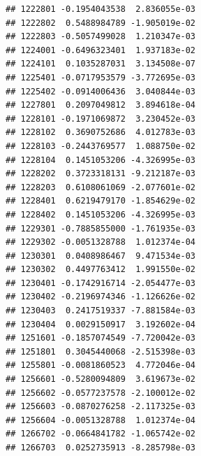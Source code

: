 \begin{frame}[fragile]
\begin{verbatim}
## 1222801 -0.1954043538  2.836055e-03
## 1222802  0.5488984789 -1.905019e-02
## 1222803 -0.5057499028  1.210347e-03
## 1224001 -0.6496323401  1.937183e-02
## 1224101  0.1035287031  3.134508e-07
## 1225401 -0.0717953579 -3.772695e-03
## 1225402 -0.0914006436  3.040844e-03
## 1227801  0.2097049812  3.894618e-04
## 1228101 -0.1971069872  3.230452e-03
## 1228102  0.3690752686  4.012783e-03
## 1228103 -0.2443769577  1.088750e-02
## 1228104  0.1451053206 -4.326995e-03
## 1228202  0.3723318131 -9.212187e-03
## 1228203  0.6108061069 -2.077601e-02
## 1228401  0.6219479170 -1.854629e-02
## 1228402  0.1451053206 -4.326995e-03
## 1229301 -0.7885855000 -1.761935e-03
## 1229302 -0.0051328788  1.012374e-04
## 1230301  0.0408986467  9.471534e-03
## 1230302  0.4497763412  1.991550e-02
## 1230401 -0.1742916714 -2.054477e-03
## 1230402 -0.2196974346 -1.126626e-02
## 1230403  0.2417519337 -7.881584e-03
## 1230404  0.0029150917  3.192602e-04
## 1251601 -0.1857074549 -7.720042e-03
## 1251801  0.3045440068 -2.515398e-03
## 1255801 -0.0081860523  4.772046e-04
## 1256601 -0.5280094809  3.619673e-02
## 1256602 -0.0577237578 -2.100012e-02
## 1256603 -0.0870276258 -2.117325e-03
## 1256604 -0.0051328788  1.012374e-04
## 1266702 -0.0664841782 -1.065742e-02
## 1266703  0.0252735913 -8.285798e-03
\end{verbatim}

\end{frame}

